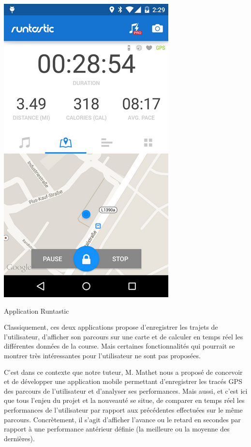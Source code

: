 \begin{multicols}{2}
\begin{img}
  \includegraphics[scale=0.9]{img/Runtastic.png}
  \caption{Application Runtastic}
\end{img}
\end{multicols}

Classiquement, ces deux applications propose d'enregistrer les trajets de l'utilisateur, d'afficher son parcours sur une carte et de calculer en temps réel les différentes données de la course. Mais certaines fonctionnalités qui pourrait se montrer très intéressantes pour l'utilisateur ne sont pas proposées.\bigskip

C'est dans ce contexte que notre tuteur, M. Mathet nous a proposé de concevoir et de développer une application mobile permettant d'enregistrer les tracés GPS des parcours de l'utilisateur et d'analyser ses performances. Mais aussi, et c'est ici que tous l'enjeu du projet et la nouveauté se situe, de comparer en temps réel les performances de l'utilisateur par rapport aux  précédentes effectuées sur le même parcours. Concrètement, il s'agit d'afficher l'avance ou le retard en secondes par rapport à une performance antérieur définie (la meilleure ou la moyenne des dernières). 
